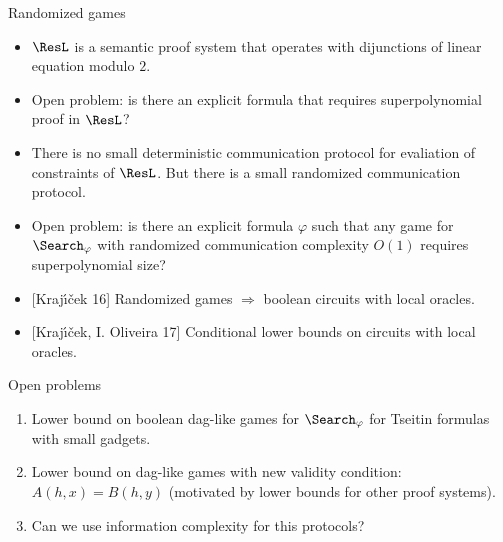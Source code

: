 \begin{frame}{Randomized games}

    \begin{itemize}
        \item $\ResL$ is a semantic proof system that operates with dijunctions of linear equation modulo
            $2$.
        \pause    
        \item Open problem: is there an explicit formula that requires superpolynomial proof in $\ResL$?
        \pause
        \item There is no small deterministic communication protocol for evaliation of constraints of
            $\ResL$. But there is a small randomized communication protocol.
        \pause
        \item Open problem: is there an explicit formula $\varphi$ such that any game for
            $\Search_{\varphi}$ with randomized communication complexity $O(1)$ requires superpolynomial
            size?
        \pause
        \item {[Kraj{\'{\i}}{\v{c}}ek 16]} Randomized games \alert{$\Rightarrow$} boolean circuits with
            local oracles.
        \pause
        \item {[Kraj{\'{\i}}{\v{c}}ek, I. Oliveira 17]} Conditional lower bounds on circuits with local
            oracles.
    \end{itemize}
\end{frame}


\begin{frame}{Open problems}
    \begin{enumerate}
            
        \pause
        \item Lower bound on boolean dag-like games for $\Search_{\varphi}$ for Tseitin formulas with small
            gadgets.
        \pause
        \item Lower bound on dag-like games with new validity condition: $A(h, x) = B(h, y)$ (motivated
            by lower bounds for other proof systems).
        \pause
        \item Can we use information complexity for this protocols?
    \end{enumerate}
\end{frame}